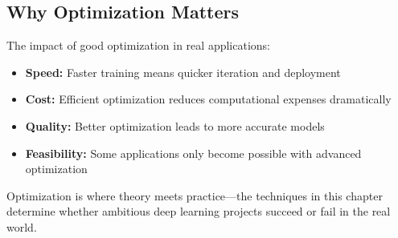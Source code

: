 \subsection{Why Optimization Matters}

The impact of good optimization in real applications:
\begin{itemize}
    \item \textbf{Speed:} Faster training means quicker iteration and deployment
    \item \textbf{Cost:} Efficient optimization reduces computational expenses dramatically
    \item \textbf{Quality:} Better optimization leads to more accurate models
    \item \textbf{Feasibility:} Some applications only become possible with advanced optimization
\end{itemize}

Optimization is where theory meets practice—the techniques in this chapter determine whether ambitious deep learning projects succeed or fail in the real world.

